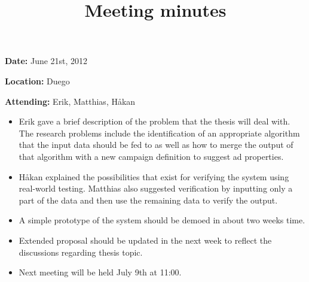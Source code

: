 \documentclass[a4paper]{article}
\begin{document}
\title{Meeting minutes}
\maketitle

\textbf{Date:} June 21st, 2012

\textbf{Location:} Duego

\textbf{Attending:} Erik, Matthias, Håkan

\begin{itemize}
	\item Erik gave a brief description of the problem that the thesis will deal with. The research problems include the
		identification of an appropriate algorithm that the input data should be fed to as well as how to merge the output of that
		algorithm with a new campaign definition to suggest ad properties.
	\item Håkan explained the possibilities that exist for verifying the system using real-world testing. Matthias also suggested
		verification by inputting only a part of the data and then use the remaining data to verify the output.
	\item A simple prototype of the system should be demoed in about two weeks time.
	\item Extended proposal should be updated in the next week to reflect the discussions regarding thesis topic.
	\item Next meeting will be held July 9th at 11:00.
\end{itemize}

 
\end{document}
